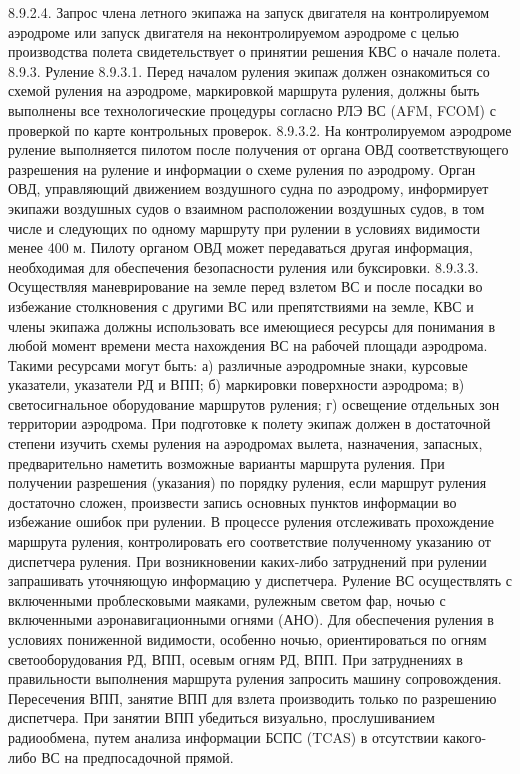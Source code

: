8.9.2.4. Запрос члена летного экипажа на запуск двигателя на контролируемом аэродроме или запуск двигателя на неконтролируемом аэродроме с целью производства полета свидетельствует о принятии решения КВС о начале полета.
8.9.3. Руление
8.9.3.1. Перед началом руления экипаж должен ознакомиться со схемой руления на аэродроме, маркировкой маршрута руления, должны быть выполнены все технологические процедуры согласно РЛЭ ВС (AFM, FCOM) с проверкой по карте контрольных проверок. 
8.9.3.2. На контролируемом аэродроме руление выполняется пилотом после получения от органа ОВД соответствующего разрешения на руление и информации о схеме руления по аэродрому. Орган ОВД, управляющий движением воздушного судна по аэродрому, информирует экипажи воздушных судов о взаимном расположении воздушных судов, в том числе и следующих по одному маршруту при рулении в условиях видимости менее 400 м. Пилоту органом ОВД может передаваться другая информация, необходимая для обеспечения безопасности руления или буксировки.
8.9.3.3. Осуществляя маневрирование на земле перед взлетом ВС и после посадки во избежание столкновения с другими ВС или препятствиями на земле, КВС и члены экипажа должны использовать все имеющиеся ресурсы для понимания в любой момент времени места нахождения ВС на рабочей площади аэродрома. 
Такими ресурсами могут быть: 
а)	различные аэродромные знаки, курсовые указатели, указатели РД и ВПП; 
б)	маркировки поверхности аэродрома; 
в)	светосигнальное оборудование маршрутов руления; 
г)	освещение отдельных зон территории аэродрома. 
При подготовке к полету экипаж должен в достаточной степени изучить схемы руления на аэродромах вылета, назначения, запасных, предварительно наметить возможные варианты маршрута руления.
При получении разрешения (указания) по порядку руления, если маршрут руления достаточно сложен, произвести запись основных пунктов информации во избежание ошибок при рулении. 
В процессе руления отслеживать прохождение маршрута руления, контролировать его соответствие полученному указанию от диспетчера руления. При возникновении каких-либо затруднений при рулении запрашивать уточняющую информацию у диспетчера. 
Руление ВС осуществлять с включенными проблесковыми маяками, рулежным светом фар, ночью с включенными аэронавигационными огнями (АНО). 
Для обеспечения руления в условиях пониженной видимости, особенно ночью, ориентироваться по огням светооборудования РД, ВПП, осевым огням РД, ВПП. При затруднениях в правильности выполнения маршрута руления запросить машину сопровождения. 
Пересечения ВПП, занятие ВПП для взлета производить только по разрешению диспетчера. При занятии ВПП убедиться визуально, прослушиванием радиообмена, путем анализа информации БСПС (TCAS) в отсутствии какого-либо ВС на предпосадочной прямой. 
